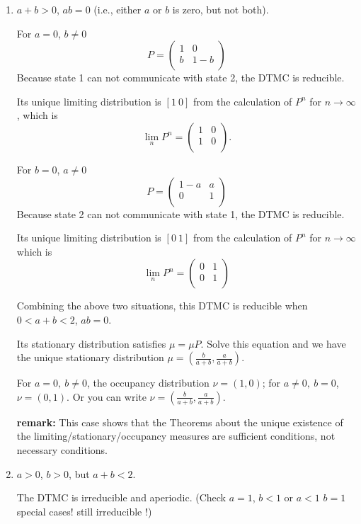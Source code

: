 \documentclass[  11pt]{article}
\begin{document}
\begin{ExerciseList}
\begin{enumerate}
\item 
$a+b>0$, $ab=0$ (i.e.,  either $a$ or $b$ is zero, but not both).\par
For $a=0$, $b\neq0$
\[
P=\left(\begin{array}{cc}
1 &0\\
b &1-b\\
\end{array}\right)
\]
Because state 1 can not communicate with state 2, the DTMC is reducible. \par
Its unique limiting distribution is $[1\ 0]$ from the calculation of $P^n$ for $n\to \infty$,
which is 
\[
\lim_n P^n=\left(\begin{array}{cc}
1 &0\\
1 &0\\
\end{array}\right).
\]
\par
For $b=0$, $a\neq0$
\[
P=\left(\begin{array}{cc}
1-a &a\\
0 &1\\
\end{array}\right)
\]
Because state 2 can not communicate with state 1, the DTMC is reducible. \par
Its unique limiting distribution is $[0\ 1]$ from the calculation of $P^n$ for $n\to \infty$
which is 
\[
\lim_n P^n=\left(\begin{array}{cc}
0 &1\\
0 &1\\
\end{array}\right)
\]


Combining the above two situations, this DTMC is reducible when $0<a+b<2$, $ab=0$.\par
Its stationary distribution satisfies $\mu=\mu P$. Solve this equation and we have the unique
stationary distribution $\mu=(\frac{b}{a+b}, \frac{a}{a+b})$.\par
For $a=0,\ b\neq0$, the occupancy distribution $\nu=(1,0)$; for $a\neq0,\ b=0$, $\nu=(0,1)$. Or you can write $\nu=(\frac{b}{a+b}, \frac{a}{a+b})$.\par

{\bf remark:} This case shows that the Theorems about the unique existence of the
limiting/stationary/occupancy measures are sufficient conditions, not necessary conditions. 


\item 
$a>0$, $b>0$, but $a+b<2$. 

The  DTMC is irreducible and aperiodic. (Check $a=1$, $b<1$ or $a<1$ $b=1$ special cases! still irreducible !) 


\end{enumerate}
\end{ExerciseList}
\end{document}
